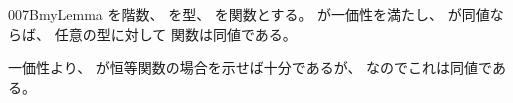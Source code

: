 \documentclass[index]{subfiles}
\begin{document}
\begin{myBlock}{007B}{myLemma}
  を階数、
  を型、
  を関数とする。
  が一価性を満たし、
  が同値ならば、
  任意の型に対して
  関数は同値である。
\end{myBlock}
\begin{myProof}
  一価性より、
  が恒等関数の場合を示せば十分であるが、
  なのでこれは同値である。
\end{myProof}
\end{document}
